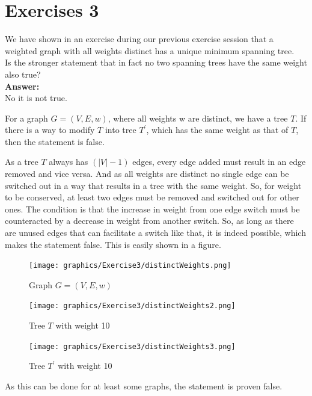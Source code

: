 \documentclass[nobib]{tufte-handout}
\newcounter{counter}
\begin{document}
\section{Exercises 3}
We have shown in an exercise during our previous exercise session that a weighted graph with all weights distinct has a unique minimum spanning tree. \\  

Is the stronger statement that in fact no two spanning trees have the same weight also true? \\

\textbf{Answer:} \\ 
No it is not true.

For a graph $G = (V,E,w)$, where all weights w are distinct, we have a tree $T$. If there is a way to modify $T$ into tree $T^\prime$, which has the same weight as that of $T$, then the statement is false. 

As a tree $T$ always has $(|V|-1)$ edges, every edge added must result in an edge removed and vice versa. And as all weights are distinct no single edge can be switched out in a way that results in a tree with the same weight. So, for weight to be conserved, at least two edges must be removed and switched out for other ones. The condition is that the increase in weight from one edge switch must be counteracted by a decrease in weight from another switch. So, as long as there are unused edges that can facilitate a switch like that, it is indeed possible, which makes the statement false. This is easily shown in a figure.

\begin{figure}
    \centering
    \texttt{[image: graphics/Exercise3/distinctWeights.png]}
    \caption{Graph $G = (V,E,w)$}
    \label{fig:G}
\end{figure}

\begin{figure}
    \centering
    \texttt{[image: graphics/Exercise3/distinctWeights2.png]}
    \caption{Tree $T$ with weight 10}
    \label{fig:T}
\end{figure}

\begin{figure}
    \centering
    \texttt{[image: graphics/Exercise3/distinctWeights3.png]}
    \caption{Tree $T^\prime$ with weight 10}
    \label{fig:G}
\end{figure}

As this can be done for at least some graphs, the statement is proven false.
\newpage
\end{document}
